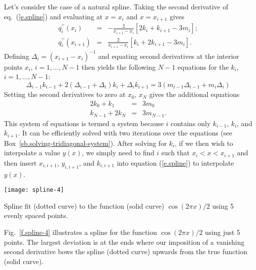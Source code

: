 Let's consider the case of a natural spline. Taking the second derivative of eq.~(\ref{e.spline}) and evaluating at $x=x_{i}$ and $x=x_{i+1}$ gives
\begin{eqnarray}
\label{e.d2spline-left}
q^{\prime\prime}_{i}(x_{i}) &=& -\frac{2}{x_{i+1}-x_{i}}\left[ 2k_{i} + k_{i+1} - 3m_{i} \right];\\
\label{e.d2spline-right}
q^{\prime\prime}_{i}(x_{i+1}) &=& \frac{2}{x_{i+1}-x_{i}}\left[ k_{i} + 2k_{i+1} - 3m_{i} \right].
\end{eqnarray}
Defining $\Delta_{i} = (x_{i+1}-x_{i})^{-1}$ and equating second derivatives at the interior points $x_{i},\,i=1,\ldots,N-1$ then yields the following $N-1$ equations for the $k_{i}$, $i=1,\ldots,N-1$:
\begin{equation}
\Delta_{i-1}k_{i-1} + 2\left(\Delta_{i-1} + \Delta_{i}\right) k_{i} + \Delta_{i}k_{i+1} = 3\left(m_{i-1}\Delta_{i-1} + m_{i}\Delta_{i}\right)
\end{equation}
Setting the second derivatives to zero at $x_{0}$, $x_{N}$ gives the additional equations
\begin{eqnarray}
2k_{0} + k_{1} &=& 3m_{0}\label{e.cubic-interpolant-1}\\
k_{N-1} + 2k_{N} &=& 3m_{N-1}.\label{e.cubic-interpolant-2}
\end{eqnarray}
This system of equations is termed a  system because $i$ contains only $k_{i-1}$, $k_{i}$, and $k_{i+1}$. It can be efficiently solved with two iterations over the equations (see Box~\ref{sb.solving-tridiagonal-system}). After solving for $k_{i}$, if we then wish to interpolate a value $y(x)$, we simply need to find $i$ such that $x_{i}< x < x_{i+1}$ and then insert $x_{i,i+1}$, $y_{i,i+1}$, and $k_{i,i+1}$ into equation (\ref{e.spline}) to interpolate $y(x)$.

\begin{marginfigure}
\texttt{[image: spline-4]}
\caption[Example of a spline fit]{\label{f.spline-4} Spline fit (dotted curve) to the function (solid curve) $\cos(2\pi x)/2$ using 5 evenly spaced points.}
\end{marginfigure}
Fig.~\ref{f.spline-4} illustrates a spline for the function $\cos(2\pi x)/2$ using just 5 points. The largest deviation is at the ends where our imposition of a vanishing second derivative bows the spline (dotted curve) upwards from the true function (solid curve).


